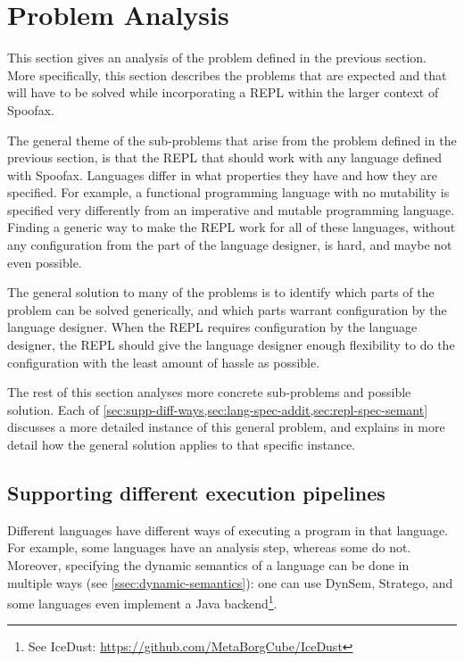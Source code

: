 \section{Problem Analysis}
\label{sec:problem-analysis}
This section gives an analysis of the problem defined in the previous
section. More specifically, this section describes the problems that
are expected and that will have to be solved while incorporating a
REPL within the larger context of Spoofax.

The general theme of the sub-problems that arise from the problem
defined in the previous section, is that the REPL that should work
with any language defined with Spoofax. Languages differ in what
properties they have and how they are specified. For example, a
functional programming language with no mutability is specified very
differently from an imperative and mutable programming
language. Finding a generic way to make the REPL work for all of these
languages, without any configuration from the part of the language
designer, is hard, and maybe not even possible.

The general solution to many of the problems is to identify which
parts of the problem can be solved generically, and which parts
warrant configuration by the language designer. When the REPL requires
configuration by the language designer, the REPL should give the
language designer enough flexibility to do the configuration with the
least amount of hassle as possible.

The rest of this section analyses more concrete sub-problems and
possible solution. Each of
\cref{sec:supp-diff-ways,sec:lang-spec-addit,sec:repl-spec-semant}
discusses a more detailed instance of this general problem, and
explains in more detail how the general solution applies to that
specific instance.


\subsection{Supporting different execution pipelines}
\label{sec:supp-diff-ways}
Different languages have different ways of executing a program in that
language. For example, some languages have an analysis step, whereas
some do not. Moreover, specifying the dynamic semantics of a language
can be done in multiple ways (see \cref{ssec:dynamic-semantics}): one
can use DynSem, Stratego, and some languages even implement a Java
backend\footnote{See IceDust:
  \url{https://github.com/MetaBorgCube/IceDust}}.

